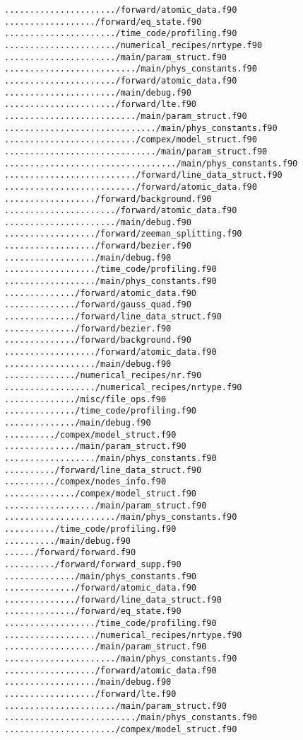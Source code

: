 \begin{verbatim}
....................../forward/atomic_data.f90
................../forward/eq_state.f90
....................../time_code/profiling.f90
....................../numerical_recipes/nrtype.f90
....................../main/param_struct.f90
........................../main/phys_constants.f90
....................../forward/atomic_data.f90
....................../main/debug.f90
....................../forward/lte.f90
........................../main/param_struct.f90
............................../main/phys_constants.f90
........................../compex/model_struct.f90
............................../main/param_struct.f90
................................../main/phys_constants.f90
........................../forward/line_data_struct.f90
........................../forward/atomic_data.f90
................../forward/background.f90
....................../forward/atomic_data.f90
....................../main/debug.f90
................../forward/zeeman_splitting.f90
................../forward/bezier.f90
................../main/debug.f90
................../time_code/profiling.f90
................../main/phys_constants.f90
............../forward/atomic_data.f90
............../forward/gauss_quad.f90
............../forward/line_data_struct.f90
............../forward/bezier.f90
............../forward/background.f90
................../forward/atomic_data.f90
................../main/debug.f90
............../numerical_recipes/nr.f90
................../numerical_recipes/nrtype.f90
............../misc/file_ops.f90
............../time_code/profiling.f90
............../main/debug.f90
........../compex/model_struct.f90
............../main/param_struct.f90
................../main/phys_constants.f90
........../forward/line_data_struct.f90
........../compex/nodes_info.f90
............../compex/model_struct.f90
................../main/param_struct.f90
....................../main/phys_constants.f90
........../time_code/profiling.f90
........../main/debug.f90
....../forward/forward.f90
........../forward/forward_supp.f90
............../main/phys_constants.f90
............../forward/atomic_data.f90
............../forward/line_data_struct.f90
............../forward/eq_state.f90
................../time_code/profiling.f90
................../numerical_recipes/nrtype.f90
................../main/param_struct.f90
....................../main/phys_constants.f90
................../forward/atomic_data.f90
................../main/debug.f90
................../forward/lte.f90
....................../main/param_struct.f90
........................../main/phys_constants.f90
....................../compex/model_struct.f90

\end{verbatim}
